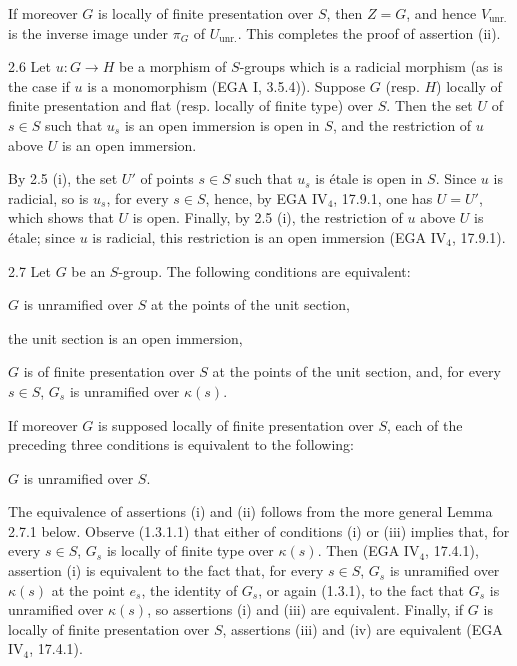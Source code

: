 If moreover $G$ is locally of finite presentation over $S$, then $Z=G$, and hence $V_{\mathrm{unr.}}$ is the inverse image under $\pi_G$ of $U_{\mathrm{unr.}}$. This completes the proof of assertion (ii).
\begin{corollary}{2.6}\label{VIB.2.6}
Let $u:G\to H$ be a morphism of $S$-groups which is a radicial morphism (as is the case if $u$ is a monomorphism (EGA I, 3.5.4)). Suppose $G$ (resp. $H$) locally of finite presentation and flat (resp. locally of finite type) over $S$. Then the set $U$ of $s\in S$ such that $u_s$ is an open immersion is open in $S$, and the restriction of $u$ above $U$ is an open immersion.
\end{corollary}
By 2.5 (i), the set $U'$ of points $s\in S$ such that $u_s$ is étale is open in $S$. Since $u$ is radicial, so is $u_s$, for every $s\in S$, hence, by EGA IV$_4$, 17.9.1, one has $U=U'$, which shows that $U$ is open. Finally, by 2.5 (i), the restriction of $u$ above $U$ is étale; since $u$ is radicial, this restriction is an open immersion (EGA IV$_4$, 17.9.1).
\begin{proposition}{2.7}\label{VIB.2.7}
Let $G$ be an $S$-group. The following conditions are equivalent:
\begin{enumeratei}
\item $G$ is unramified over $S$ at the points of the unit section,
\item the unit section is an open immersion,
\item $G$ is of finite presentation over $S$ at the points of the unit section, and, for every $s\in S$, $G_s$ is unramified over $\kappa(s)$.
\end{enumeratei}
If moreover $G$ is supposed locally of finite presentation over $S$, each of the preceding three conditions is equivalent to the following:
\begin{enumeratei}\setcounter{enumi}{3}
\item $G$ is unramified over $S$.
\end{enumeratei}
\end{proposition}
The equivalence of assertions (i) and (ii) follows from the more general Lemma 2.7.1 below. Observe (1.3.1.1) that either of conditions (i) or (iii) implies that, for every $s\in S$, $G_s$ is locally of finite type over $\kappa(s)$. Then (EGA IV$_4$, 17.4.1), assertion (i) is equivalent to the fact that, for every $s\in S$, $G_s$ is unramified over $\kappa(s)$ at the point $e_s$, the identity of $G_s$, or again (1.3.1), to the fact that $G_s$ is unramified over $\kappa(s)$, so assertions (i) and (iii) are equivalent. Finally, if $G$ is locally of finite presentation over $S$, assertions (iii) and (iv) are equivalent (EGA IV$_4$, 17.4.1).
